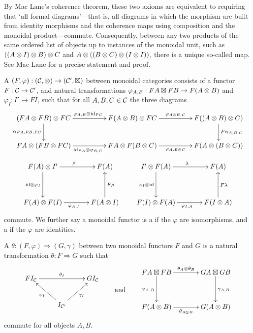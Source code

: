 By Mac Lane's coherence theorem, these two axioms are equivalent to requiring
that `all formal diagrams'---that is, all diagrams in which the morphism are
built from identity morphisms and the coherence maps using composition and the
monoidal product---commute. Consequently, between any two products of the same
ordered list of objects up to instances of the monoidal unit, such as $((A \otimes
I) \otimes B) \otimes C$ and $A \otimes ((B \otimes C) \otimes (I \otimes I))$, there is a unique
so-called  map. See Mac Lane \cite[Corollary of Theorem
VII.2.1]{Mac98} for a precise statement and proof.

A  $(F, \varphi): ({\mathcal{C}},\otimes) \to ({\mathcal{C}}',\boxtimes)$
between monoidal categories consists of a functor $F: {\mathcal{C}} \to {\mathcal{C}}'$, and natural
transformations $\varphi_{A,B}: FA \boxtimes FB \to F(A \otimes B)$ and $\varphi_I:
I' \to FI$, such that for all $A,B,C \in {\mathcal{C}}$ the three diagrams
\[
  \xymatrixcolsep{4pc}
  \xymatrix{
    (FA \ot FB) \ot FC \ar[d]_{\a_{FA,FB,FC}} \ar[r]^{\varphi_{A,B} \ot \idn_{FC}} &
    F(A \ot B) \ot FC \ar[r]^{\varphi_{A\ot B,C}} & F((A \ot B) \ot C) \ar[d]^{F\a_{A,B,C}}\\
    FA \ot (FB \ot FC) \ar[r]_{\idn_{FA} \ot \varphi_{B,C}} & FA \ot F(B \ot C)
    \ar[r]_{\varphi_{A,B\ot C}} & F(A \ot (B \ot C))
  }
\]
\[
  \xymatrixcolsep{3pc}
  \xymatrixrowsep{3pc}
  \xymatrix{
    F(A) \ot I' \ar[d]_{\idn \ot \varphi_I} \ar[r]^{\rho} & F(A) \\
    F(A) \ot F(I) \ar[r]_{\varphi_{A,I}} & F(A \ot I) \ar[u]_{F\rho} 
  }
  \qquad
  \xymatrix{
    I' \ot F(A) \ar[d]_{\varphi_I \ot \idn} \ar[r]^{\lambda} & F(A) \\
    F(I) \ot F(A) \ar[r]_{\varphi_{I,A}} & F(I \ot A) \ar[u]_{F\lambda} 
  }
\]
commute. We further say a monoidal functor is a 
if the $\varphi$ are isomorphisms, and a  if the
$\varphi$ are identities. 

A  $\theta: (F,\varphi) \Rightarrow
(G,\gamma)$ between two monoidal functors $F$ and $G$ is a natural
transformation $\theta: F \Rightarrow G$ such that
\[
  \begin{aligned}
    \xymatrix{
      FI_{\c} \ar[rr]^{\theta_I}&& GI_{\c} \\
      & I_{\c'} \ar[ul]^{\varphi_I} \ar[ur]_{\gamma_I}
    } 
  \end{aligned} 
  \qquad 
  \mbox{and}
  \qquad
  \begin{aligned}
    \xymatrixcolsep{3pc}
    \xymatrixrowsep{3pc}
    \xymatrix{
      FA \boxtimes FB \ar[r]^{\theta_A \ot \theta_B} \ar[d]_{\varphi_{A,B}} 
      & GA \boxtimes GB \ar[d]^{\gamma_{A,B}}\\
      F(A \ot B) \ar[r]_{\theta_{A\ot B}} & G(A \ot B)
    }
  \end{aligned} 
\]
commute for all objects $A,B$.

